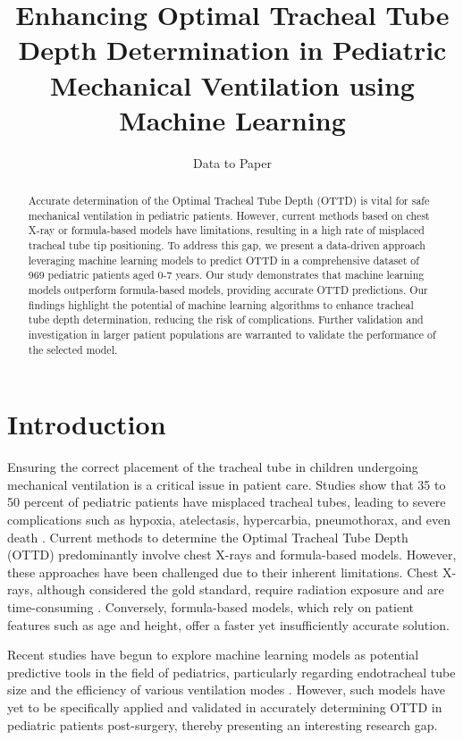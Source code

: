 \documentclass[11pt]{article}
\title{Enhancing Optimal Tracheal Tube Depth Determination in Pediatric Mechanical Ventilation using Machine Learning}
\author{Data to Paper}
\begin{document}
\maketitle
\begin{abstract}
Accurate determination of the Optimal Tracheal Tube Depth (OTTD) is vital for safe mechanical ventilation in pediatric patients. However, current methods based on chest X-ray or formula-based models have limitations, resulting in a high rate of misplaced tracheal tube tip positioning. To address this gap, we present a data-driven approach leveraging machine learning models to predict OTTD in a comprehensive dataset of 969 pediatric patients aged 0-7 years. Our study demonstrates that machine learning models outperform formula-based models, providing accurate OTTD predictions. Our findings highlight the potential of machine learning algorithms to enhance tracheal tube depth determination, reducing the risk of complications. Further validation and investigation in larger patient populations are warranted to validate the performance of the selected model.
\end{abstract}
\section*{Introduction}

Ensuring the correct placement of the tracheal tube in children undergoing mechanical ventilation is a critical issue in patient care. Studies show that 35 to 50 percent of pediatric patients have misplaced tracheal tubes, leading to severe complications such as hypoxia, atelectasis, hypercarbia, pneumothorax, and even death \cite{Kollef1994EndotrachealTM, Licker2007PerioperativeMM}. Current methods to determine the Optimal Tracheal Tube Depth (OTTD) predominantly involve chest X-rays and formula-based models. However, these approaches have been challenged due to their inherent limitations. Chest X-rays, although considered the gold standard, require radiation exposure and are time-consuming \cite{Kollef1994EndotrachealTM}. Conversely, formula-based models, which rely on patient features such as age and height, offer a faster yet insufficiently accurate solution.

Recent studies have begun to explore machine learning models as potential predictive tools in the field of pediatrics, particularly regarding endotracheal tube size \cite{Zhou2022PredictionOE} and the efficiency of various ventilation modes \cite{Yan2020TheCS, Cheng2016RiskPW}. However, such models have yet to be specifically applied and validated in accurately determining OTTD in pediatric patients post-surgery, thereby presenting an interesting research gap.
\end{document}
